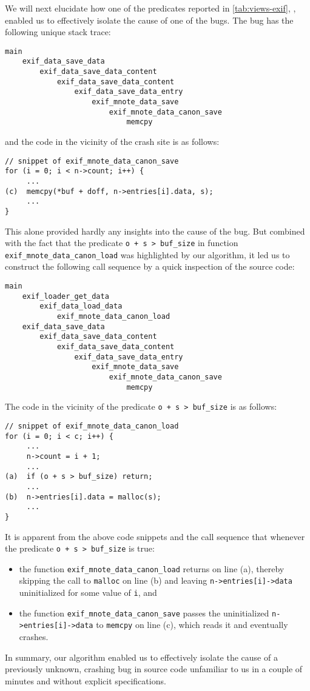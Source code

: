 We will next elucidate how one of the predicates reported in \autoref{tab:views-exif},
\exifpred, enabled us to effectively isolate the cause of one of the bugs.
The bug has the following unique stack trace:
\begin{verbatim}
main
    exif_data_save_data
        exif_data_save_data_content
            exif_data_save_data_content
                exif_data_save_data_entry
                    exif_mnote_data_save
                        exif_mnote_data_canon_save
                            memcpy
\end{verbatim}
and the code in the vicinity of the crash site is as follows:
\begin{verbatim}
// snippet of exif_mnote_data_canon_save
for (i = 0; i < n->count; i++) {
     ...
(c)  memcpy(*buf + doff, n->entries[i].data, s);
     ...
}
\end{verbatim}
This alone provided hardly any insights into the cause of the bug.
But combined with the fact that the predicate {\tt o + s > buf\_size} in function
{\tt exif\_mnote\_data\_canon\_load} was highlighted by our algorithm,
it led us to construct the following call sequence by a quick inspection of the
source code:
\begin{verbatim}
main
    exif_loader_get_data 
        exif_data_load_data
            exif_mnote_data_canon_load
    exif_data_save_data
        exif_data_save_data_content
            exif_data_save_data_content
                exif_data_save_data_entry
                    exif_mnote_data_save
                        exif_mnote_data_canon_save
                            memcpy
\end{verbatim}
The code in the vicinity of the predicate {\tt o + s > buf\_size} is as follows:
\begin{verbatim}
// snippet of exif_mnote_data_canon_load
for (i = 0; i < c; i++) {
     ...
     n->count = i + 1;
     ...
(a)  if (o + s > buf_size) return;
     ...
(b)  n->entries[i].data = malloc(s); 
     ...
}
\end{verbatim}
It is apparent from the above code snippets and the
call sequence that whenever the predicate {\tt o + s > buf\_size} is true:
\begin{itemize}
\item
the function {\tt exif\_mnote\_data\_canon\_load} returns on line (a),
thereby skipping the call to {\tt malloc} on line (b) and leaving {\tt n->entries[i]->data}
uninitialized for some value of {\tt i}, and
\item
the function {\tt exif\_mnote\_data\_canon\_save} passes the uninitialized
{\tt n->entries[i]->data} to {\tt memcpy} on line (c), which reads it
and eventually crashes.
\end{itemize}
In summary, our algorithm enabled us to effectively isolate
the cause of a previously unknown, crashing bug in source code unfamiliar to us in
a couple of minutes and without explicit specifications.
